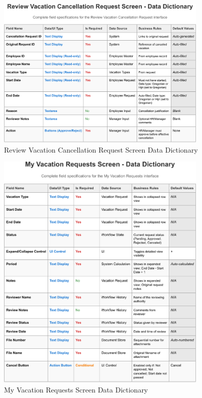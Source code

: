 \documentclass[12pt,a4paper]{article}
\begin{document}
\begin{figure}[H]
\centering
\includegraphics[width=0.9\textwidth]{Data-Dictionary/Screen-Data-Dictionaries/Review-Vacation-Cancellation-Request-Screen-Data-Dictionary/Review-Vacation-Cancellation-Request-Screen-Data-Dictionary-1.png}
\caption{Review Vacation Cancellation Request Screen Data Dictionary}
\label{fig:review-cancellation-data-dict}
\end{figure}

\begin{figure}[H]
\centering
\includegraphics[width=0.9\textwidth]{Data-Dictionary/Screen-Data-Dictionaries/My-Vacation-Requests-Screen-Data-Dictionary/My-Vacation-Requests-Screen-Data-Dictionary-1.png}
\caption{My Vacation Requests Screen Data Dictionary}
\label{fig:my-vacation-requests-data-dict}
\end{figure}
\end{document}
